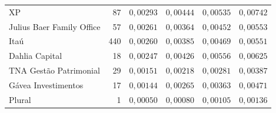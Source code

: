 \documentclass[11pt,a4paper]{article}
\begin{document}
\begin{center}
\begin{longtable}{@{}lrrrrr@{}}
XP & 87 & $0{,}00293$ & $0{,}00444$ & $0{,}00535$ & $0{,}00742$ \\
Julius Baer Family Office & 57 & $0{,}00261$ & $0{,}00364$ & $0{,}00452$ & $0{,}00553$ \\
Itaú & 440 & $0{,}00260$ & $0{,}00385$ & $0{,}00469$ & $0{,}00551$ \\
Dahlia Capital & 18 & $0{,}00247$ & $0{,}00426$ & $0{,}00556$ & $0{,}00625$ \\
TNA Gestão Patrimonial & 29 & $0{,}00151$ & $0{,}00218$ & $0{,}00281$ & $0{,}00387$ \\
Gávea Investimentos & 17 & $0{,}00144$ & $0{,}00265$ & $0{,}00363$ & $0{,}00471$ \\
Plural & 1 & $0{,}00050$ & $0{,}00080$ & $0{,}00105$ & $0{,}00136$ \\
\end{longtable}
\end{center}
\end{document}
